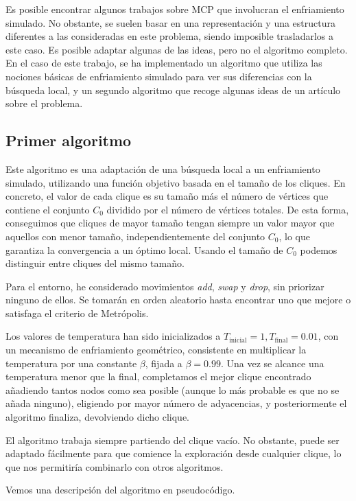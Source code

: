 Es posible encontrar algunos trabajos sobre MCP que involucran el enfriamiento simulado. No obstante,
se suelen basar en una representación y una estructura diferentes a las consideradas en este problema,
siendo imposible trasladarlos a este caso. Es posible adaptar algunas de las ideas, pero no el algoritmo
completo. En el caso de este trabajo, se ha implementado un algoritmo que utiliza las nociones
básicas de enfriamiento simulado para ver sus diferencias con la búsqueda local, y un segundo algoritmo
que recoge algunas ideas de un artículo sobre el problema.

\subsection{Primer algoritmo}

Este algoritmo es una adaptación de una búsqueda local a un enfriamiento simulado, utilizando una función
objetivo basada en el tamaño de los cliques. En concreto, el valor de cada clique es su tamaño más el número
de vértices que contiene el conjunto $C_0$ dividido por el número de vértices totales. De esta forma,
conseguimos que cliques de mayor tamaño tengan siempre un valor mayor que aquellos con menor tamaño, independientemente
del conjunto $C_0$, lo que garantiza la convergencia a un óptimo local. Usando el tamaño de $C_0$ podemos
distinguir entre cliques del mismo tamaño.

Para el entorno, he considerado movimientos \textit{add}, \textit{swap} y \textit{drop}, sin priorizar
ninguno de ellos. Se tomarán en orden aleatorio hasta encontrar uno que mejore o satisfaga el criterio de
Metrópolis.

Los valores de temperatura han sido inicializados a $T_{\text{inicial}} = 1, T_{\text{final}} = 0.01$, con un
mecanismo de enfriamiento geométrico, consistente en multiplicar la temperatura por una constante $\beta$, fijada a
$\beta = 0.99$. Una vez se alcance una temperatura menor que la final, completamos el mejor clique encontrado añadiendo
tantos nodos como sea posible (aunque lo más probable es que no se añada ninguno), eligiendo por mayor número de
adyacencias, y posteriormente el algoritmo finaliza, devolviendo dicho clique.

El algoritmo trabaja siempre partiendo del clique vacío. No obstante, puede ser adaptado fácilmente para que
comience la exploración desde cualquier clique, lo que nos permitiría combinarlo con otros algoritmos.

Vemos una descripción del algoritmo en pseudocódigo.

